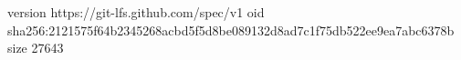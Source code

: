 version https://git-lfs.github.com/spec/v1
oid sha256:2121575f64b2345268acbd5f5d8be089132d8ad7c1f75db522ee9ea7abc6378b
size 27643

